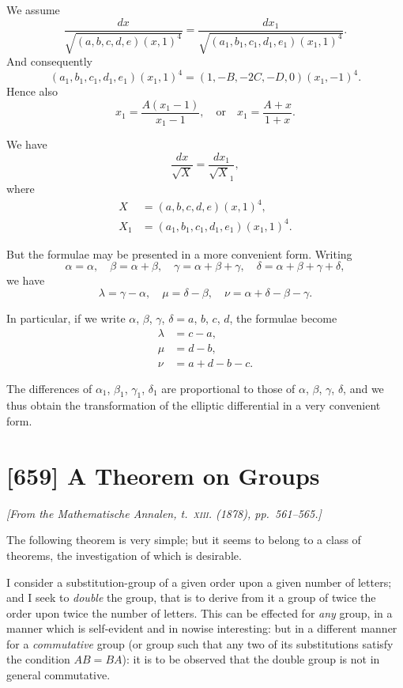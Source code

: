 \documentclass[11pt,a4paper]{book}
\begin{document}
We assume
\[
\frac{dx}{\sqrt{(a, b, c, d, e)(x, 1)^4}} = \frac{dx_1}{\sqrt{(a_1, b_1, c_1, d_1, e_1)(x_1, 1)^4}}.
\]
And consequently
\[
(a_1, b_1, c_1, d_1, e_1)(x_1, 1)^4 = (1, -B, -2C, -D, 0)(x_1, -1)^4.
\]
Hence also
\[
x_1 = \frac{A(x_1 - 1)}{x_1 - 1}, \quad \text{or} \quad x_1 = \frac{A + x}{1 + x}.
\]

We have
\[
\frac{dx}{\surd X} = \frac{dx_1}{\surd X_1},
\]
where
\begin{align*}
X &= (a, b, c, d, e)(x, 1)^4, \\
X_1 &= (a_1, b_1, c_1, d_1, e_1)(x_1, 1)^4.
\end{align*}

But the formulae may be presented in a more convenient form. Writing
\[
\alpha = \alpha, \quad \beta = \alpha + \beta, \quad \gamma = \alpha + \beta + \gamma, \quad \delta = \alpha + \beta + \gamma + \delta,
\]
we have
\[
\lambda = \gamma - \alpha, \quad \mu = \delta - \beta, \quad \nu = \alpha + \delta - \beta - \gamma.
\]

In particular, if we write $\alpha$, $\beta$, $\gamma$, $\delta = a$, $b$, $c$, $d$, the formulae become
\begin{align*}
\lambda &= c - a, \\
\mu &= d - b, \\
\nu &= a + d - b - c.
\end{align*}

The differences of $\alpha_1$, $\beta_1$, $\gamma_1$, $\delta_1$ are proportional to those of $\alpha$, $\beta$, $\gamma$, $\delta$, and we thus obtain the transformation of the elliptic differential in a very convenient form.

\newpage
\section{[659] A Theorem on Groups}
\label{sec:659}

\noindent\textit{[From the \emph{Mathematische Annalen}, t.~\textsc{xiii}. (1878), pp.~561--565.]}

\medskip

The following theorem is very simple; but it seems to belong to a class of theorems, the investigation of which is desirable.

I consider a substitution-group of a given order upon a given number of letters; and I seek to \emph{double} the group, that is to derive from it a group of twice the order upon twice the number of letters. This can be effected for \emph{any} group, in a manner which is self-evident and in nowise interesting: but in a different manner for a \emph{commutative} group (or group such that any two of its substitutions satisfy the condition $AB = BA$): it is to be observed that the double group is not in general commutative.
\end{document}
